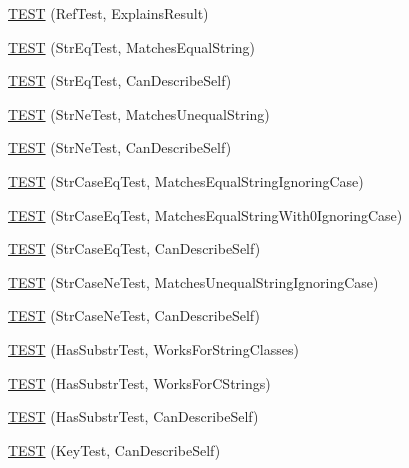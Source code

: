 \begin{DoxyCompactItemize}
\hyperlink{namespacetesting_1_1gmock__matchers__test_ab73595bcf8dd511b519b640248136ccd}{T\+E\+ST} (Ref\+Test, Explains\+Result)
\item 
\hyperlink{namespacetesting_1_1gmock__matchers__test_a5956b46686ad29d2d29b313bce9eba8a}{T\+E\+ST} (Str\+Eq\+Test, Matches\+Equal\+String)
\item 
\hyperlink{namespacetesting_1_1gmock__matchers__test_a1cb9d74bdf937816807e91b842b22c75}{T\+E\+ST} (Str\+Eq\+Test, Can\+Describe\+Self)
\item 
\hyperlink{namespacetesting_1_1gmock__matchers__test_a3c0a0ca54e3d34c55bd30c2b5572d902}{T\+E\+ST} (Str\+Ne\+Test, Matches\+Unequal\+String)
\item 
\hyperlink{namespacetesting_1_1gmock__matchers__test_a4daef0c28c6b07cb3d6a6306c05599b0}{T\+E\+ST} (Str\+Ne\+Test, Can\+Describe\+Self)
\item 
\hyperlink{namespacetesting_1_1gmock__matchers__test_ae0c0b82b3895923747dc70cb9339a8dc}{T\+E\+ST} (Str\+Case\+Eq\+Test, Matches\+Equal\+String\+Ignoring\+Case)
\item 
\hyperlink{namespacetesting_1_1gmock__matchers__test_aa159c9a52c6dc18cb7f214fbb5bddece}{T\+E\+ST} (Str\+Case\+Eq\+Test, Matches\+Equal\+String\+With0\+Ignoring\+Case)
\item 
\hyperlink{namespacetesting_1_1gmock__matchers__test_ab4fb6542ea3a7789850668a9266a80ef}{T\+E\+ST} (Str\+Case\+Eq\+Test, Can\+Describe\+Self)
\item 
\hyperlink{namespacetesting_1_1gmock__matchers__test_a9a627f8538cfff62fbaee86ac465f6c8}{T\+E\+ST} (Str\+Case\+Ne\+Test, Matches\+Unequal\+String\+Ignoring\+Case)
\item 
\hyperlink{namespacetesting_1_1gmock__matchers__test_ae953891c7961b6ffd51dc712be8d24de}{T\+E\+ST} (Str\+Case\+Ne\+Test, Can\+Describe\+Self)
\item 
\hyperlink{namespacetesting_1_1gmock__matchers__test_a2a1043a0b8bfb4bc0b5fb539317132a3}{T\+E\+ST} (Has\+Substr\+Test, Works\+For\+String\+Classes)
\item 
\hyperlink{namespacetesting_1_1gmock__matchers__test_a147dde340ba8f77308cd116d3bb831d6}{T\+E\+ST} (Has\+Substr\+Test, Works\+For\+C\+Strings)
\item 
\hyperlink{namespacetesting_1_1gmock__matchers__test_ae47e8ad8f8a4a33ac08b596eb839380e}{T\+E\+ST} (Has\+Substr\+Test, Can\+Describe\+Self)
\item 
\hyperlink{namespacetesting_1_1gmock__matchers__test_acdbdca45a537261fd168cdb8df9348d7}{T\+E\+ST} (Key\+Test, Can\+Describe\+Self)

\end{DoxyCompactItemize}
